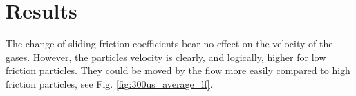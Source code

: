 


\section{Results}
\label{sec:resultsbf}


The change of sliding friction coefficients bear no effect on the
velocity of the gases. 
However, the particles velocity is clearly, and logically, higher for low
friction particles. 
They could be moved by the flow more easily compared to high
friction particles, see Fig. \ref{fig:300us_average_lf}.






